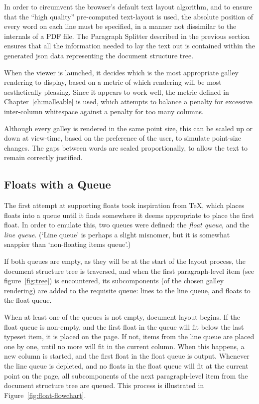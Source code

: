 In order to circumvent the browser's default text layout algorithm, and to ensure that the ``high quality'' pre-computed text-layout is used, the absolute position of every word on each line must be specified, in a manner not dissimilar to the internals of a PDF file. The Paragraph Splitter described in the previous section ensures that all the information needed to lay the text out is contained within the generated \gls{json} data representing the document structure tree.


When the viewer is launched, it decides which is the most appropriate galley rendering to display, based on a metric of which rendering will be most aesthetically pleasing. Since it appears to work well, the metric defined in Chapter~\ref{ch:malleable} is used, which attempts to balance a penalty for excessive inter-column whitespace against a penalty for too many columns. 

Although every galley is rendered in the same point size, this can be scaled up or down at view-time, based on the preference of the user, to simulate point-size changes. The gaps between words are scaled proportionally, to allow the text to remain correctly justified.




\subsection{Floats with a Queue}
The first attempt at supporting floats took inspiration from \TeX, which places floats into a queue until it finds somewhere it deems appropriate to place the first float. In order to emulate this, two queues were defined: the \emph{float queue}, and the \emph{line queue}. (`Line queue' is perhaps a slight misnomer, but it is somewhat snappier than `non-floating items queue'.)


If both queues are empty, as they will be at the start of the layout process, the document structure tree is traversed, and when the first paragraph-level item (see figure~\ref{fig:tree}) is encountered, its subcomponents (of the chosen galley rendering) are added to the requisite queue: lines to the line queue, and floats to the float queue.

When at least one of the queues is not empty, document layout begins. If the float queue is non-empty, and the first float in the queue will fit below the last typeset item, it is placed on the page. If not, items from the line queue are placed one by one, until no more will fit in the current column. When this happens, a new column is started, and the first float in the float queue is output. Whenever the line queue is depleted, and no floats in the float queue will fit at the current point on the page, all subcomponents of the next paragraph-level item from the document structure tree are queued. This process is illustrated in Figure~\ref{fig:float-flowchart}.

